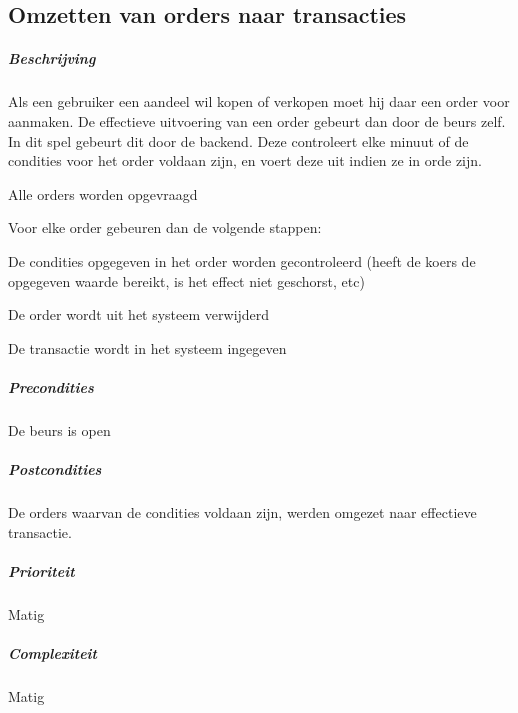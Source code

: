 \subsection{Omzetten van orders naar transacties}
\begin{compact}
\subparagraph{Beschrijving} Als een gebruiker een aandeel wil kopen of verkopen moet hij daar een order voor aanmaken. De effectieve uitvoering van een order gebeurt dan door de beurs zelf. In dit spel gebeurt dit door de backend. Deze controleert elke minuut of de condities voor het order voldaan zijn, en voert deze uit indien ze in orde zijn.
\begin{itemize_compact}
	\item Alle orders worden opgevraagd
  \item Voor elke order gebeuren dan de volgende stappen:
	\begin{itemize_compact}
		\item De condities opgegeven in het order worden gecontroleerd (heeft de koers de opgegeven waarde bereikt, is het effect niet geschorst, etc)
		\item De order wordt uit het systeem verwijderd
		\item De transactie wordt in het systeem ingegeven
	\end{itemize_compact}
\end{itemize_compact}
\subparagraph{Precondities} De beurs is open 
\subparagraph{Postcondities} De orders waarvan de condities voldaan zijn, werden omgezet naar effectieve transactie.
\subparagraph{Prioriteit}Matig
\subparagraph{Complexiteit}Matig
\end{compact}

